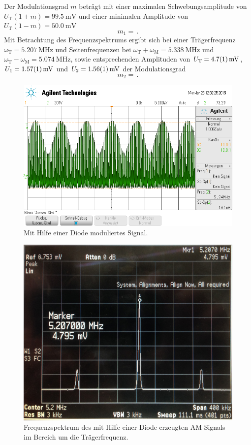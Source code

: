 Der Modulationsgrad $m$ beträgt mit einer maximalen Schwebungsamplitude
von $U_\text{T}(1+m)=\SI{99.5}{\milli\volt}$ und einer minimalen Amplitude
von $U_\text{T}(1-m)=\SI{50.0}{\milli\volt}$
\begin{equation*}
    m_1 = \,.
\end{equation*}
Mit Betrachtung des Frequenzspektrums ergibt sich bei einer Trägerfrequenz
$\omega_\text{T} = \SI{5.207}{\mega\hertz}$ und Seitenfrequenzen bei
$\omega_\text{T} + \omega_\text{M} = \SI{5.338}{\mega\hertz}$ und
$\omega_\text{T} - \omega_\text{M} = \SI{5.074}{\mega\hertz}$, sowie
entsprechenden Amplituden von $U_\text{T} = \SI{4.7+-0.1}{\milli\volt}$,
$U_1 = \SI{1.57+-0.01}{\milli\volt}$ und $U_2 = \SI{1.56+-0.01}{\milli\volt}$
der Modulationsgrad
\begin{equation*}
    m_2 = \,.
\end{equation*}
\begin{figure}
    \centering
    \includegraphics[width=0.8\linewidth]{images/am-diode-signal.png}
    \caption{Mit Hilfe einer Diode moduliertes Signal.}
    \label{fig:am-diode-signal}
\end{figure}
\begin{figure}
    \centering
    \includegraphics[width=0.8\linewidth]{images/am-diode-spektrum.jpg}
    \caption{
        Frequenzspektrum des mit Hilfe einer Diode erzeugten AM-Signals im
        Bereich um die Trägerfrequenz.
    }
    \label{fig:am-diode-spektrum}
\end{figure}
